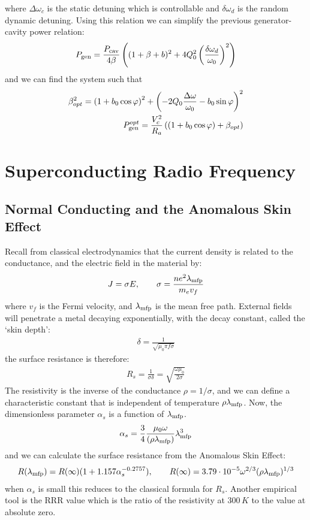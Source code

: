 \documentclass{article}
\numberwithin{equation}{section}
\begin{document}
where $\Delta \omega_c$ is the static detuning which is controllable and $\delta \omega_d$ is the random dynamic detuning. Using this relation we can simplify the previous generator-cavity power relation:
\begin{align}
P_{\rm gen} = \frac{P_{\rm cav}}{4 \beta} \left( (1+\beta+b)^2 + 4 Q_0^2 \left( \frac{\delta \omega_d}{\omega_0} \right)^2 \right)
\end{align}
and we can find the system such that 
\begin{align}
\beta^2_{opt} = \left(1+b_0 \cos \varphi\right)^2 + \left(-2Q_0 \frac{\Delta \omega}{\omega_0}- b_0 \sin \varphi \right)^2 \\
P_{\rm gen}^{opt} = \frac{V_c^2}{R_a} \left( (1+b_0 \cos \varphi) + \beta_{opt} \right)
\end{align}

\section{Superconducting Radio Frequency}

\subsection{ Normal Conducting and the Anomalous Skin Effect }
Recall from classical electrodynamics that the current density is related to the conductance, and the electric field in the material by:
\begin{align}
J = \sigma E ,\qquad \sigma = \frac{n e^2 \lambda_{\rm mfp}}{m_e v_f}
\end{align}
where $v_f$ is the Fermi velocity, and $\lambda_{\rm mfp}$ is the mean free path. External fields will penetrate a metal decaying exponentially, with the decay constant, called the `skin depth':
\begin{align}
\delta = \frac{1}{\sqrt{ \mu_0 \pi f \sigma }}
\end{align}
the surface resistance is therefore:
\begin{align}
R_s = \frac{1}{\sigma \delta} = \sqrt{\frac{\omega \mu_0}{2 \sigma}}
\end{align}
The resistivity is the inverse of the conductance $\rho = 1/\sigma$, and we can define a characteristic constant that is independent of temperature $\rho \lambda_{\rm mfp}$. Now, the dimensionless parameter $\alpha_s$ is a function of $\lambda_{\rm mfp}$.
\begin{align}
\alpha_s = \frac{3}{4} \frac{\mu_0 \omega}{(\rho \lambda_{\rm mfp})} \lambda_{\rm mfp}^3
\end{align}
and we can calculate the surface resistance from the Anomalous Skin Effect:
\begin{align}
R(\lambda_{\rm mfp}) = R(\infty) (1+1.157 \alpha_s^{-0.2757}) ,\qquad
R(\infty) = 3.79 \cdot 10^{-5} \omega^{2/3} (\rho \lambda_{\rm mfp})^{1/3}
\end{align}
when $\alpha_s$ is small this reduces to the classical formula for $R_s$. Another empirical tool is the RRR value which is the ratio of the resistivity at $300 \, \si{K}$ to the value at absolute zero.
\end{document}
